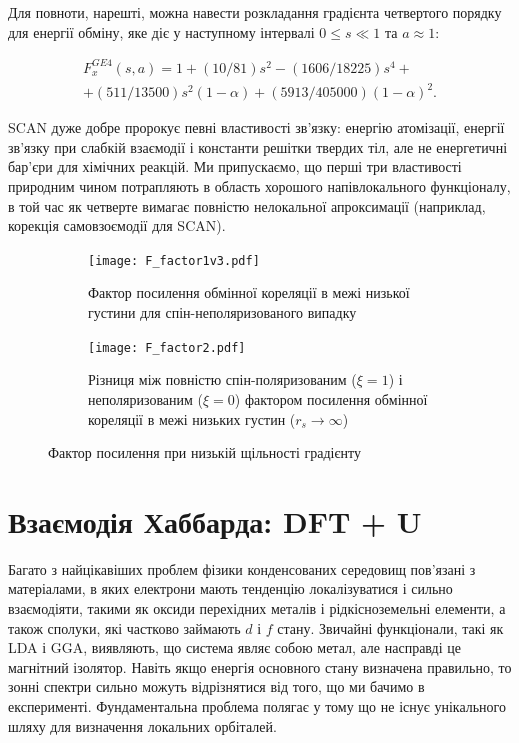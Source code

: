 Для повноти, нарешті, можна навести розкладання градієнта четвертого порядку для енергії обміну, яке діє у наступному інтервалі $0 \leq s \ll 1$ та $a \approx 1:$

\begin{eqnarray}
	F_x^{GE4}(s,a) = 1+(10/81)s^2 - (1606/18225)s^4 +\nonumber \\
 + (511/13500)s^2(1-\alpha) + (5913/405000)(1-\alpha)^2.      
\end{eqnarray}

SCAN дуже добре пророкує певні властивості зв'язку: енергію атомізації, енергії зв'язку при слабкій взаємодії і константи решітки твердих тіл, але не енергетичні бар'єри для хімічних реакцій. Ми припускаємо, що перші три властивості природним чином потрапляють в область хорошого напівлокального функціоналу, в той час як четверте вимагає повністю нелокальної апроксимації (наприклад, корекція самовзоємодії для SCAN).
 
\begin{figure}[H]
\centering
\label{fig:F_factor}
	\begin{subfigure}{.9\textwidth}
		\hspace*{-1.2cm}
    	\texttt{[image: F\_factor1v3.pdf]}
    	\caption{Фактор посилення обмінної кореляції в межі низької густини для спін-неполяризованого випадку}
    	\label{fig:sub1}	
	\end{subfigure}
	
	\begin{subfigure}{.9\textwidth}
		\hspace*{0.15cm}
    	\texttt{[image: F\_factor2.pdf]}
    	\caption{
    	Різниця між повністю спін-поляризованим ($\xi = 1$) і неполяризованим ($\xi = 0$) фактором посилення обмінної кореляції в межі низьких густин ($r_s \rightarrow \infty$)}
    	\label{fig:sub1}	
	\end{subfigure}
\caption{Фактор посилення при низькій щільності градієнту}
\end{figure}

\section{Взаємодія Хаббарда: DFT + U}
Багато з найцікавіших проблем фізики конденсованих середовищ пов'язані з матеріалами, в яких електрони мають тенденцію локалізуватися і сильно взаємодіяти, такими як оксиди перехідних металів і рідкісноземельні елементи, а також сполуки, які частково займають $d$ і $f$ стану. Звичайні функціонали, такі як LDA і GGA, виявляють, що система являє собою метал, але насправді це магнітний ізолятор. Навіть якщо енергія основного стану визначена правильно, то зонні спектри сильно можуть відрізнятися від того, що ми бачимо в експерименті. Фундаментальна проблема полягає у тому що не існує унікального шляху для визначення локальних орбіталей. 

